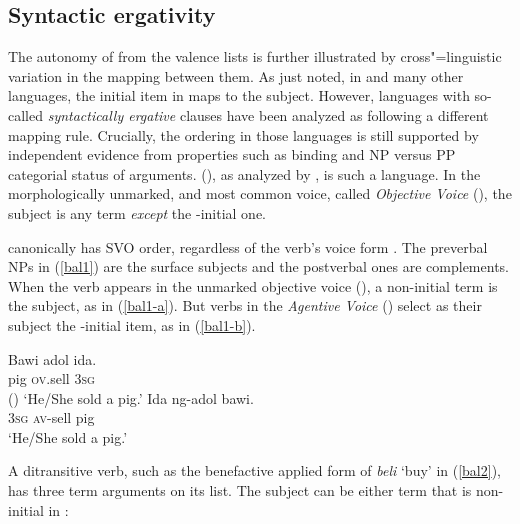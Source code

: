 \documentclass[output=paper,biblatex,babelshorthands,newtxmath,draftmode,colorlinks, citecolor=brown]{langscibook}
\begin{document}
\subsection{Syntactic ergativity}
\label{ergativity}\label{arg-st-sec-ergativity}

The autonomy of \argst from the valence lists is further illustrated by
cross"=linguistic variation in the mapping between them.  As just noted, in  and many
other languages, the initial item in \argst maps to the subject.  However, languages with so-called
\emph{syntactically ergative} clauses have been analyzed as following a different mapping rule.
Crucially, the \argst ordering in those languages is still supported by independent evidence from
properties such as binding and NP versus PP categorial status of arguments.  
(), as analyzed by \citet{Wechsler+Arka:1998}, is such a language.  In the
morphologically unmarked, and most common voice, called \emph{Objective Voice}
(), the subject is any term \textit{except} the \argst-initial one.

 canonically has SVO order, regardless of the verb's voice form
\citep{Artawa1994, Wechsler+Arka:1998}.  The preverbal NPs in (\ref{bal1}) are the surface subjects
and the postverbal ones are complements.  When the verb appears in the unmarked objective voice
(), a non-initial term is the subject, as in (\ref{bal1-a}).  But verbs in the
\emph{Agentive Voice} () select as their subject the \argst{}-initial
item, as in (\ref{bal1-b}).

\begin{exe}
	\ex\label{bal1}
\begin{xlist}
\ex \label{bal1-a}	
\gll Bawi adol ida.  \\
     pig \textsc{ov}.sell \textsc{3sg}   \\\hfill()
\glt `He/She sold a pig.'
\ex\label{bal1-b}
\gll Ida ng-adol bawi.  \\
     \textsc{3sg} \textsc{av}-sell pig   \\
\glt `He/She sold a pig.'
\end{xlist}
\end{exe} 

\largerpage
\noindent
A ditransitive verb, such as the benefactive applied form of \textit{beli} `buy' in
(\ref{bal2}), has three term arguments on its \argst list.  The subject can be either term that is
non-initial in \argst{}:
\end{document}
